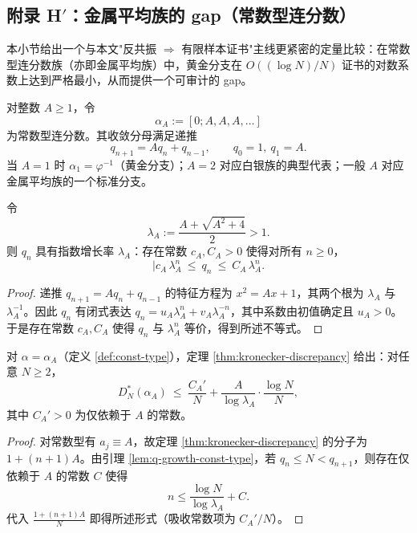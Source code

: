 \subsection{附录 H\texorpdfstring{$'$}{'}：金属平均族的 gap（常数型连分数）}\label{app:kronecker-discrepancy-metallic-gap}

本小节给出一个与本文"反共振 $\Rightarrow$ 有限样本证书"主线更紧密的定量比较：在常数型连分数族（亦即金属平均族）中，黄金分支在 $O((\log N)/N)$ 证书的对数系数上达到严格最小，从而提供一个可审计的 gap。

\begin{definition}[常数型与金属平均族]\label{def:const-type}
对整数 $A\ge 1$，令
\[
\alpha_A:=[0;A,A,A,\dots]
\]
为常数型连分数。其收敛分母满足递推
\[
q_{n+1}=Aq_n+q_{n-1},\qquad q_0=1,\ q_1=A.
\]
当 $A=1$ 时 $\alpha_1=\varphi^{-1}$（黄金分支）；$A=2$ 对应白银族的典型代表；一般 $A$ 对应金属平均族的一个标准分支。
\end{definition}

\begin{lemma}[指数增长率]\label{lem:q-growth-const-type}
令
\[
\lambda_A:=\frac{A+\sqrt{A^2+4}}{2}>1.
\]
则 $q_n$ 具有指数增长率 $\lambda_A$：存在常数 $c_A,C_A>0$ 使得对所有 $n\ge 0$，
\[
|c_A\,\lambda_A^n\ \le\ q_n\ \le\ C_A\,\lambda_A^n.
\]
\end{lemma}

\begin{proof}
递推 $q_{n+1}=Aq_n+q_{n-1}$ 的特征方程为 $x^2=Ax+1$，其两个根为 $\lambda_A$ 与 $\lambda_A^{-1}$。因此 $q_n$ 有闭式表达 $q_n=u_A\lambda_A^n+v_A\lambda_A^{-n}$，其中系数由初值确定且 $u_A>0$。于是存在常数 $c_A,C_A$ 使得 $q_n$ 与 $\lambda_A^n$ 等价，得到所述不等式。
\end{proof}

\begin{proposition}\label{prop:const-type-envelope}
对 $\alpha=\alpha_A$（定义 \ref{def:const-type}），定理 \ref{thm:kronecker-discrepancy} 给出：对任意 $N\ge 2$，
\[
D_N^*(\alpha_A)\ \le\ \frac{C_A'}{N}+\frac{A}{\log\lambda_A}\cdot\frac{\log N}{N},
\]
其中 $C_A'>0$ 为仅依赖于 $A$ 的常数。
\end{proposition}

\begin{proof}
对常数型有 $a_j\equiv A$，故定理 \ref{thm:kronecker-discrepancy} 的分子为 $1+(n+1)A$。由引理 \ref{lem:q-growth-const-type}，若 $q_n\le N<q_{n+1}$，则存在仅依赖于 $A$ 的常数 $C$ 使得
\[
n\le \frac{\log N}{\log \lambda_A}+C.
\]
代入 $\frac{1+(n+1)A}{N}$ 即得所述形式（吸收常数项为 $C_A'/N$）。
\end{proof}

